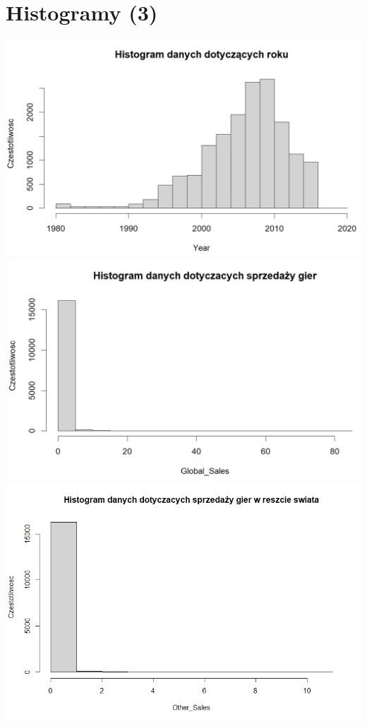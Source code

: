 \documentclass[12pt]{article}
\begin{document}
	\section{Histogramy (3)}
	\includegraphics[scale=0.25]{HistogramRok}\\
	\includegraphics[scale=0.4]{HistogramSales}\\
	\includegraphics[scale=0.6]{HistogramOther}\\
\end{document}
